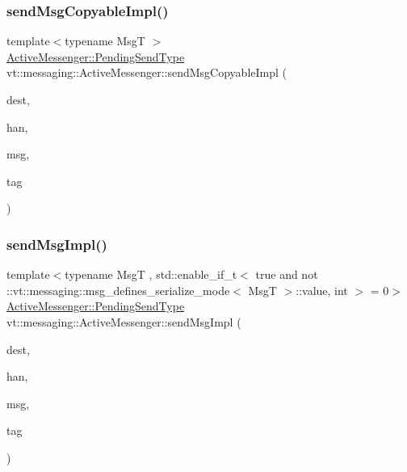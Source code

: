 \subsubsection{\texorpdfstring{send\+Msg\+Copyable\+Impl()}{sendMsgCopyableImpl()}}
{\footnotesize\ttfamily template$<$typename MsgT $>$ \\
\hyperlink{structvt_1_1messaging_1_1_active_messenger_a3626a6ca76d8ad4ec7c3b47a2c70d3a8}{Active\+Messenger\+::\+Pending\+Send\+Type} vt\+::messaging\+::\+Active\+Messenger\+::send\+Msg\+Copyable\+Impl (\begin{DoxyParamCaption}\item[{\hyperlink{namespacevt_a866da9d0efc19c0a1ce79e9e492f47e2}{Node\+Type}}]{dest,  }\item[{\hyperlink{namespacevt_af64846b57dfcaf104da3ef6967917573}{Handler\+Type}}]{han,  }\item[{\hyperlink{structvt_1_1messaging_1_1_msg_shared_ptr}{Msg\+Shared\+Ptr}$<$ MsgT $>$ \&}]{msg,  }\item[{\hyperlink{namespacevt_a84ab281dae04a52a4b243d6bf62d0e52}{Tag\+Type}}]{tag }\end{DoxyParamCaption})}

\mbox{\label{structvt_1_1messaging_1_1_active_messenger_aae60feeb3e184a5a77d9be6e7c43d91a}} 
\subsubsection{\texorpdfstring{send\+Msg\+Impl()}{sendMsgImpl()}\hspace{0.1cm}{\footnotesize\ttfamily [1/4]}}
{\footnotesize\ttfamily template$<$typename MsgT , std\+::enable\+\_\+if\+\_\+t$<$ true and not \+::vt\+::messaging\+::msg\+\_\+defines\+\_\+serialize\+\_\+mode$<$ Msg\+T $>$\+::value, int $>$  = 0$>$ \\
\hyperlink{structvt_1_1messaging_1_1_active_messenger_a3626a6ca76d8ad4ec7c3b47a2c70d3a8}{Active\+Messenger\+::\+Pending\+Send\+Type} vt\+::messaging\+::\+Active\+Messenger\+::send\+Msg\+Impl (\begin{DoxyParamCaption}\item[{\hyperlink{namespacevt_a866da9d0efc19c0a1ce79e9e492f47e2}{Node\+Type}}]{dest,  }\item[{\hyperlink{namespacevt_af64846b57dfcaf104da3ef6967917573}{Handler\+Type}}]{han,  }\item[{\hyperlink{structvt_1_1messaging_1_1_msg_shared_ptr}{Msg\+Shared\+Ptr}$<$ MsgT $>$ \&}]{msg,  }\item[{\hyperlink{namespacevt_a84ab281dae04a52a4b243d6bf62d0e52}{Tag\+Type}}]{tag }\end{DoxyParamCaption})\hspace{0.3cm}{\ttfamily [inline]}}


